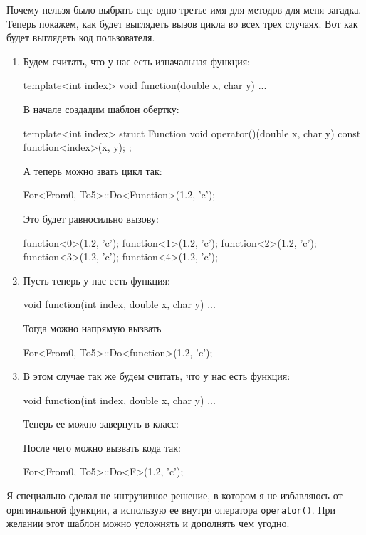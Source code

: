 Почему нельзя было выбрать еще одно третье имя для методов для меня загадка.
Теперь покажем, как будет выглядеть вызов цикла во всех трех случаях.
Вот как будет выглядеть код пользователя.
\begin{enumerate}
\item Будем считать, что у нас есть изначальная функция:
\begin{cppcode}
template<int index>
void function(double x, char y) {...}
\end{cppcode}
В начале создадим шаблон обертку:
\begin{cppcode}
template<int index>
struct Function {
  void operator()(double x, char y) const {
    function<index>(x, y);
  }
};
\end{cppcode}
А теперь можно звать цикл так:
\begin{cppcode}
For<From{0}, To{5}>::Do<Function>(1.2, 'c');
\end{cppcode}
Это будет равносильно вызову:
\begin{cppcode}
function<0>(1.2, 'c');
function<1>(1.2, 'c');
function<2>(1.2, 'c');
function<3>(1.2, 'c');
function<4>(1.2, 'c');
\end{cppcode}

\item Пусть теперь у нас есть функция:
\begin{cppcode}
void function(int index, double x, char y) {...}
\end{cppcode}
Тогда можно напрямую вызвать
\begin{cppcode}
For<From{0}, To{5}>::Do<function>(1.2, 'c');
\end{cppcode}

\item В этом случае так же будем считать, что у нас есть функция:
\begin{cppcode}
void function(int index, double x, char y) {...}
\end{cppcode}
Теперь ее можно завернуть в класс:
\begin{cppcode}
struct F {
  void operator()(int index, double x, char y) const {
    function(index, x, y);
};
\end{cppcode}
После чего можно вызвать кода так:
\begin{cppcode}
For<From{0}, To{5}>::Do<F>(1.2, 'c');
\end{cppcode}
\end{enumerate}
Я специально сделал не интрузивное решение, в котором я не избавляюсь от оригинальной функции, а использую ее внутри оператора \verb"operator()".
При желании этот шаблон можно усложнять и дополнять чем угодно.

